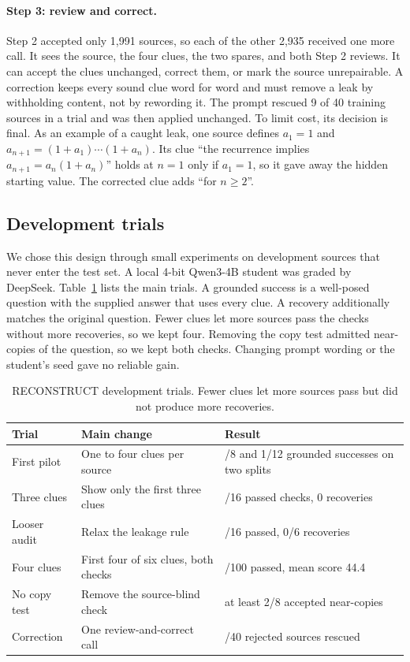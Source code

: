 \documentclass[11pt]{article}
\begin{document}
\paragraph{Step 3: review and correct.} Step 2 accepted only 1,991 sources, so each of the other 2,935 received one more call. It sees the source, the four clues, the two spares, and both Step 2 reviews. It can accept the clues unchanged, correct them, or mark the source unrepairable. A correction keeps every sound clue word for word and must remove a leak by withholding content, not by rewording it. The prompt rescued 9 of 40 training sources in a trial and was then applied unchanged. To limit cost, its decision is final. As an example of a caught leak, one source defines $a_1=1$ and $a_{n+1}=(1+a_1)\cdots(1+a_n)$. Its clue ``the recurrence implies $a_{n+1}=a_n(1+a_n)$'' holds at $n=1$ only if $a_1=1$, so it gave away the hidden starting value. The corrected clue adds ``for $n\ge2$''.

\subsection{Development trials}

We chose this design through small experiments on development sources that never enter the test set. A local 4-bit Qwen3-4B student was graded by DeepSeek. Table~\ref{tab:recon-dev} lists the main trials. A grounded success is a well-posed question with the supplied answer that uses every clue. A recovery additionally matches the original question. Fewer clues let more sources pass the checks without more recoveries, so we kept four. Removing the copy test admitted near-copies of the question, so we kept both checks. Changing prompt wording or the student's seed gave no reliable gain.

\begin{table}[t]
\centering
\footnotesize
\setlength{\tabcolsep}{3pt}
\begin{tabular}{>{\raggedright\arraybackslash}p{}>{\raggedright\arraybackslash}p{}>{\raggedright\arraybackslash}p{}}
\toprule
Trial & Main change & Result \\
\midrule
First pilot & One to four clues per source & 3/8 and 1/12 grounded successes on two splits \\
Three clues & Show only the first three clues & 7/16 passed checks, 0 recoveries \\
Looser audit & Relax the leakage rule & 6/16 passed, 0/6 recoveries \\
Four clues & First four of six clues, both checks & 52/100 passed, mean score 44.4 \\
No copy test & Remove the source-blind check & at least 2/8 accepted near-copies \\
Correction & One review-and-correct call & 9/40 rejected sources rescued \\
\bottomrule
\end{tabular}
\caption{RECONSTRUCT development trials. Fewer clues let more sources pass but did not produce more recoveries.}
\label{tab:recon-dev}
\end{table}
\end{document}
